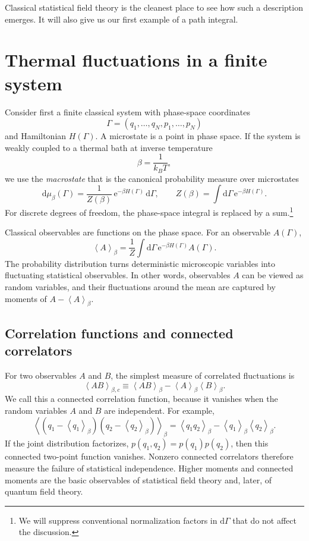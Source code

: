\documentclass[11pt]{article}
\newcommand{\dd}{\mathrm{d}}
\newcommand{\e}{\mathrm{e}}
\newcommand{\avg}[1]{\left\langle #1\right\rangle_\beta}
\newcommand{\avgc}[1]{\left\langle #1\right\rangle_{\beta,c}}
\begin{document}
Classical statistical field theory is the cleanest place to see how such a description emerges.  It will also give us our first example of a path integral.


\section{Thermal fluctuations in a finite system}

Consider first a finite classical system with phase-space coordinates
\begin{equation}
  \Gamma=(q_1,\ldots,q_N,p_1,\ldots,p_N)
\end{equation}
and Hamiltonian $H(\Gamma)$.  A microstate is a point in phase space.  If the system is weakly coupled to a thermal bath at inverse temperature
\begin{equation}
  \beta=\frac{1}{k_B T},
\end{equation}
we use the {\it macrostate} that is the canonical probability measure over microstates
\begin{equation}
  \dd\mu_\beta(\Gamma)=\frac{1}{Z(\beta)}\,\e^{-\beta H(\Gamma)}\,\dd\Gamma,
  \qquad
  Z(\beta)=\int \dd\Gamma\,\e^{-\beta H(\Gamma)}.
  \label{eq:canonical}
\end{equation}
For discrete degrees of freedom, the phase-space integral is replaced by a sum.\footnote{We will suppress conventional normalization factors in $\dd\Gamma$ that do not affect the discussion.}

Classical observables are functions on the phase space. For an observable $A(\Gamma)$,
\begin{equation}
  \avg{A}=\frac{1}{Z}\int \dd\Gamma\,\e^{-\beta H(\Gamma)}A(\Gamma).
\end{equation}
The probability distribution turns deterministic microscopic variables into fluctuating statistical observables. In other words, observables $A$ can be viewed as random variables, and their fluctuations around the mean are captured by moments of $A-\avg{A}$. 

\subsection{Correlation functions and connected correlators}

For two observables $A$ and $B$, the simplest measure of correlated fluctuations is
\begin{equation}
  \avgc{AB}
  \equiv
  \avg{AB}-\avg{A}\avg{B}.
  \label{eq:connected}
\end{equation}
We call this a connected correlation function, because it vanishes when the random variables $A$ and $B$ are independent.
For example,
\begin{equation}
  \avg{(q_1-\avg{q_1})(q_2-\avg{q_2})}
  =\avg{q_1q_2}-\avg{q_1}\avg{q_2}.
\end{equation}
If the joint distribution factorizes, $p(q_1,q_2)=p(q_1)p(q_2)$, then this connected two-point function vanishes.  Nonzero connected correlators therefore measure the failure of statistical independence. Higher moments and connected moments are the basic observables of statistical field theory and, later, of quantum field theory.
\end{document}
